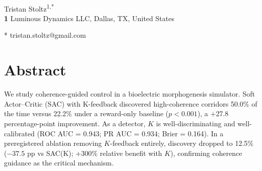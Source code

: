 \documentclass[10pt,letterpaper]{article}
\begin{document}
\vspace*{0.2in}

\begin{flushleft}
{\Large
\textbf{}
}
\newline
\\
Tristan Stoltz\textsuperscript{1,*}
\\
\bigskip
\textbf{1} Luminous Dynamics LLC, Dallas, TX, United States
\\
\bigskip

% 
%





* tristan.stoltz@gmail.com

\end{flushleft}
\section*{Abstract}

We study coherence-guided control in a bioelectric morphogenesis simulator. Soft Actor–Critic (SAC) with K-feedback discovered high-coherence corridors 50.0\% of the time versus 22.2\% under a reward-only baseline ($p < 0.001$), a +27.8 percentage-point improvement. As a detector, $K$ is well-discriminating and well-calibrated (ROC AUC = 0.943; PR AUC = 0.934; Brier = 0.164). In a preregistered ablation removing $K$-feedback entirely, discovery dropped to 12.5\% ($-37.5$ pp vs SAC(K); +300\% relative benefit with $K$), confirming coherence guidance as the critical mechanism.
\end{document}
